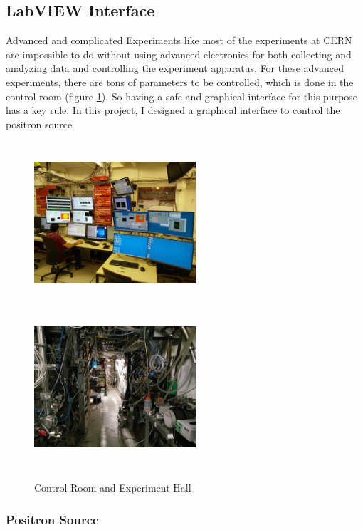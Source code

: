 \documentclass[12pt,a4paper]{article}
\begin{document}
\newpage


\subsection{LabVIEW Interface}

Advanced and complicated Experiments like most of the experiments at CERN are impossible to do without using advanced electronics for both collecting and analyzing data and controlling the experiment apparatus. For these advanced experiments, there are tons of parameters to be controlled, which is done in the control room (figure \ref{control}). 
So having a safe and graphical interface for this purpose has a key rule. In this project, I designed a graphical interface to control the positron source

\begin{figure}[h]
\centering
\includegraphics[width=60mm, height=60mm]{control_room}
\includegraphics[width=60mm, height=60mm]{experiment_hall}
\caption{Control Room and Experiment Hall}
\label{control}
\end{figure}




\subsubsection{Positron Source}
\end{document}
